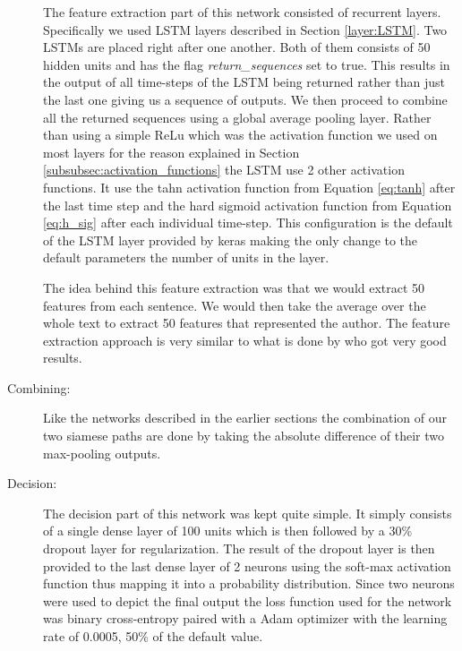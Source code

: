 \begin{description}
        The feature extraction part of this network consisted of recurrent
        layers. Specifically we used \gls{LSTM} layers described in
        Section \ref{layer:LSTM}. Two \glspl{LSTM} are placed right after
        one another. Both of them consists of 50 hidden units and has the flag
        \textit{return\_sequences} set to true. This results in the output
        of all time-steps of the \gls{LSTM} being returned rather than just
        the last one giving us a sequence of outputs. We then proceed to
        combine all the returned sequences using a global average pooling
        layer. Rather than using a simple \gls{ReLu} which was the activation
        function we used on most layers for the reason explained in Section
        \ref{subsubsec:activation_functions} the \gls{LSTM} use 2 other
        activation functions. It use the tahn activation function from Equation
        \eqref{eq:tanh} after the last time step and the hard sigmoid activation
        function from Equation \eqref{eq:h_sig} after each individual time-step.
        This configuration is the default of the \gls{LSTM} layer provided by
        keras making the only change to the default parameters the number of
        units in the layer.

        The idea behind this feature extraction was that we would extract
        50 features from each sentence. We would then take the average over
        the whole text to extract 50 features that represented the author.
        The feature extraction approach is very similar to what is done by
        \citet{qian:2018} who got very good results.

    \item[Combining:]

        Like the networks described in the earlier sections the combination
        of our two siamese paths are done by taking the absolute difference
        of their two max-pooling outputs.

    \item[Decision:]

        The decision part of this network was kept quite simple. It simply
        consists of a single dense layer of 100 units which is then followed
        by a 30\% dropout layer for regularization. The result of the dropout
        layer is then provided to the last dense layer of 2 neurons using
        the soft-max activation function thus mapping it into a probability
        distribution. Since two neurons were used to depict the final output
        the loss function used for the network was binary cross-entropy paired
        with a \gls{Adam} optimizer with the learning rate of 0.0005, 50\% of
        the default value.

\end{description}

